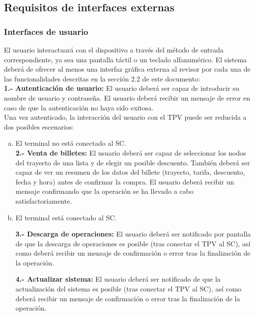 \subsection{Requisitos de interfaces externas}

\subsubsection{Interfaces de usuario}

El usuario interactuará con el dispositivo a través del método de entrada correspondiente, ya sea una pantalla táctil o un teclado alfanumérico. El sistema deberá de ofrecer al menos una interfaz gráfica externa al revisor por cada una de las funcionalidades descritas en la sección 2.2 de este documento:\\

\textbf{1.- Autenticación de usuario:} El usuario deberá ser capaz de introducir su nombre de usuario y contraseña. El usuario deberá recibir un mensaje de error en caso de que la autenticación no haya sido exitosa.\\

Una vez autenticado, la interacción del usuario con el TPV puede ser reducida a dos posibles escenarios:

\begin{enumerate}[(a)]
\item El terminal no está conectado al SC.\\

\textbf{2.- Venta de billetes:} El usuario deberá ser capaz de seleccionar los nodos del trayecto de una lista y de elegir un posible descuento. También deberá ser capaz de ver un resumen de los datos del billete (trayecto, tarifa, descuento, fecha y hora) antes de confirmar la compra. El usuario deberá recibir un mensaje confirmando que la operación se ha llevado a cabo satisfactoriamente.

\item El terminal está conectado al SC.

\textbf{3.- Descarga de operaciones:} El usuario deberá ser notificado por pantalla de que la descarga de operaciones es posible (tras conectar el TPV al SC), así como deberá recibir un mensaje de confirmación o error tras la finalización de la operación.

\textbf{4.- Actualizar sistema:} El usuario deberá ser notificado de que la actualización del sistema es posible (tras conectar el TPV al SC), así como deberá recibir un mensaje de confirmación o error tras la finalización de la operación.

\end{enumerate}

